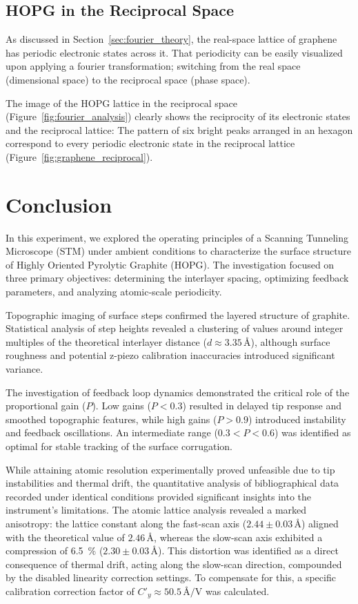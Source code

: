 \documentclass[a4paper]{article}
\begin{document}
\subsection{HOPG in the Reciprocal Space}
As discussed in Section~\ref{sec:fourier_theory}, the real-space lattice of graphene has periodic electronic states across it. That periodicity can be easily visualized upon applying a fourier transformation; switching from the real space (dimensional space) to the reciprocal space (phase space).

The image of the HOPG lattice in the reciprocal space (Figure~\ref{fig:fourier_analysis}) clearly shows the reciprocity of its electronic states and the reciprocal lattice: The pattern of six bright peaks arranged in an hexagon correspond to every periodic electronic state in the reciprocal lattice (Figure~\ref{fig:graphene_reciprocal}).

\section{Conclusion}
In this experiment, we explored the operating principles of a Scanning Tunneling Microscope (STM) under ambient conditions to characterize the surface structure of Highly Oriented Pyrolytic Graphite (HOPG). The investigation focused on three primary objectives: determining the interlayer spacing, optimizing feedback parameters, and analyzing atomic-scale periodicity.

Topographic imaging of surface steps confirmed the layered structure of graphite. Statistical analysis of step heights revealed a clustering of values around integer multiples of the theoretical interlayer distance ($d \approx 3.35\,\text{\AA}$), although surface roughness and potential z-piezo calibration inaccuracies introduced significant variance.

The investigation of feedback loop dynamics demonstrated the critical role of the proportional gain ($P$). Low gains ($P < 0.3$) resulted in delayed tip response and smoothed topographic features, while high gains ($P > 0.9$) introduced instability and feedback oscillations. An intermediate range ($0.3 < P < 0.6$) was identified as optimal for stable tracking of the surface corrugation.

While attaining atomic resolution experimentally proved unfeasible due to tip instabilities and thermal drift, the quantitative analysis of bibliographical data recorded under identical conditions provided significant insights into the instrument's limitations. The atomic lattice analysis revealed a marked anisotropy: the lattice constant along the fast-scan axis ($2.44 \pm 0.03\,\text{\AA}$) aligned with the theoretical value of $2.46\,\text{\AA}$, whereas the slow-scan axis exhibited a compression of \qty{6.5}{\%} ($2.30 \pm 0.03\,\text{\AA}$). This distortion was identified as a direct consequence of thermal drift, acting along the slow-scan direction, compounded by the disabled linearity correction settings. To compensate for this, a specific calibration correction factor of $C'_{y} \approx 50.5\,\text{\AA}/\text{V}$ was calculated.
\end{document}
